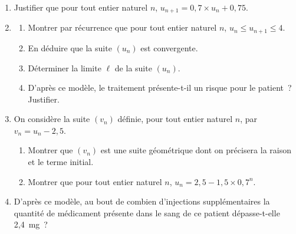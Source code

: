\documentclass[10pt]{article}
\begin{document}
\begin{enumerate}
\item Justifier que pour tout entier naturel $n$, $u_{n+1} = 0,7 \times u_n + 0,75$.
\item
\begin{enumerate}[label=\textbf{\alph*.}]
\item Montrer par récurrence que pour tout entier naturel $n$, $u_n \leqslant u_{n+1} \leqslant 4$.
\item En déduire que la suite $(u_n)$ est convergente.
\item Déterminer la limite $\ell$ de la suite $(u_n)$.
\item D'après ce modèle, le traitement présente-t-il un risque pour le patient~? Justifier.
\end{enumerate}
\item On considère la suite $(v_n)$ définie, pour tout entier naturel $n$, par $v_n = u_n - 2,5$.
\begin{enumerate}[label=\textbf{\alph*.}]
\item Montrer que $(v_n)$ est une suite géométrique dont on précisera la raison et le terme initial.
\item Montrer que pour tout entier naturel $n$, $u_n = 2,5 - 1,5 \times 0,7^n$.
\end{enumerate}
\item D'après ce modèle, au bout de combien d'injections supplémentaires la quantité de médicament présente dans le sang de ce patient dépasse-t-elle 2,4~mg~?
\end{enumerate}
\end{document}
